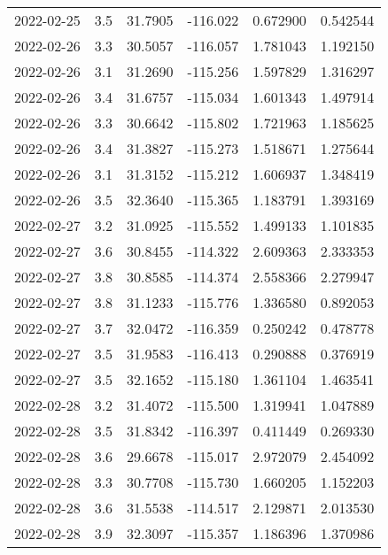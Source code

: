 \begin{tabular}{lrrrrr}
2022-02-25 &       3.5 &  31.7905 &  -116.022 &         0.672900 &         0.542544 \\
2022-02-26 &       3.3 &  30.5057 &  -116.057 &         1.781043 &         1.192150 \\
2022-02-26 &       3.1 &  31.2690 &  -115.256 &         1.597829 &         1.316297 \\
2022-02-26 &       3.4 &  31.6757 &  -115.034 &         1.601343 &         1.497914 \\
2022-02-26 &       3.3 &  30.6642 &  -115.802 &         1.721963 &         1.185625 \\
2022-02-26 &       3.4 &  31.3827 &  -115.273 &         1.518671 &         1.275644 \\
2022-02-26 &       3.1 &  31.3152 &  -115.212 &         1.606937 &         1.348419 \\
2022-02-26 &       3.5 &  32.3640 &  -115.365 &         1.183791 &         1.393169 \\
2022-02-27 &       3.2 &  31.0925 &  -115.552 &         1.499133 &         1.101835 \\
2022-02-27 &       3.6 &  30.8455 &  -114.322 &         2.609363 &         2.333353 \\
2022-02-27 &       3.8 &  30.8585 &  -114.374 &         2.558366 &         2.279947 \\
2022-02-27 &       3.8 &  31.1233 &  -115.776 &         1.336580 &         0.892053 \\
2022-02-27 &       3.7 &  32.0472 &  -116.359 &         0.250242 &         0.478778 \\
2022-02-27 &       3.5 &  31.9583 &  -116.413 &         0.290888 &         0.376919 \\
2022-02-27 &       3.5 &  32.1652 &  -115.180 &         1.361104 &         1.463541 \\
2022-02-28 &       3.2 &  31.4072 &  -115.500 &         1.319941 &         1.047889 \\
2022-02-28 &       3.5 &  31.8342 &  -116.397 &         0.411449 &         0.269330 \\
2022-02-28 &       3.6 &  29.6678 &  -115.017 &         2.972079 &         2.454092 \\
2022-02-28 &       3.3 &  30.7708 &  -115.730 &         1.660205 &         1.152203 \\
2022-02-28 &       3.6 &  31.5538 &  -114.517 &         2.129871 &         2.013530 \\
2022-02-28 &       3.9 &  32.3097 &  -115.357 &         1.186396 &         1.370986 \\

\end{tabular}
